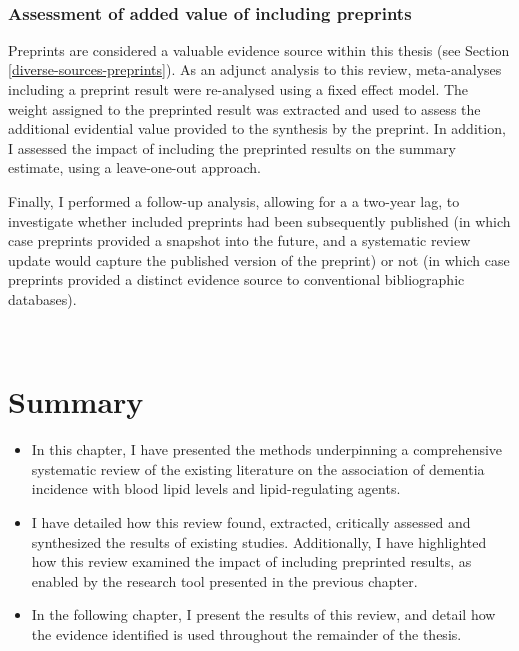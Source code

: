 \documentclass[a4paper, twoside]{templates/ociamthesis}
\begin{document}
~

\hypertarget{assessment-of-added-value-of-including-preprints}{%
\subsubsection{Assessment of added value of including preprints}\label{assessment-of-added-value-of-including-preprints}}

Preprints are considered a valuable evidence source within this thesis (see Section \ref{diverse-sources-preprints}). As an adjunct analysis to this review, meta-analyses including a preprint result were re-analysed using a fixed effect model. The weight assigned to the preprinted result was extracted and used to assess the additional evidential value provided to the synthesis by the preprint. In addition, I assessed the impact of including the preprinted results on the summary estimate, using a leave-one-out approach.

Finally, I performed a follow-up analysis, allowing for a a two-year lag, to investigate whether included preprints had been subsequently published (in which case preprints provided a snapshot into the future, and a systematic review update would capture the published version of the preprint) or not (in which case preprints provided a distinct evidence source to conventional bibliographic databases).

~

\hypertarget{summary-2}{%
\section{Summary}\label{summary-2}}

\begin{itemize}
\item
  In this chapter, I have presented the methods underpinning a comprehensive systematic review of the existing literature on the association of dementia incidence with blood lipid levels and lipid-regulating agents.
\item
  I have detailed how this review found, extracted, critically assessed and synthesized the results of existing studies. Additionally, I have highlighted how this review examined the impact of including preprinted results, as enabled by the research tool presented in the previous chapter.
\item
  In the following chapter, I present the results of this review, and detail how the evidence identified is used throughout the remainder of the thesis.
\end{itemize}
\end{document}
